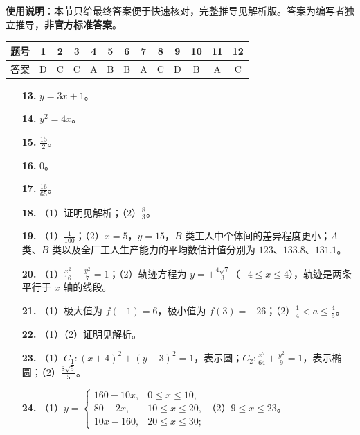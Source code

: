 
\begin{gknotice}
\textbf{使用说明}：本节只给最终答案便于快速核对，完整推导见解析版。答案为编写者独立推导，\textbf{非官方标准答案}。
\end{gknotice}

\begin{center}\begin{tabular}{ccccccccccccc}
\toprule
题号 & 1 & 2 & 3 & 4 & 5 & 6 & 7 & 8 & 9 & 10 & 11 & 12 \\
\midrule
答案 & D & C & C & A & B & B & A & C & D & B & A & C \\
\bottomrule
\end{tabular}\end{center}

\begin{itemize}[leftmargin=2.6em]
  \item[\textbf{13.}] $y=3x+1$。
  \item[\textbf{14.}] $y^2=4x$。
  \item[\textbf{15.}] $\frac{15}{2}$。
  \item[\textbf{16.}] $0$。
\end{itemize}

\begin{itemize}[leftmargin=2.6em]
  \item[\textbf{17.}] $\frac{16}{65}$。
  \item[\textbf{18.}] （1）证明见解析；（2）$\frac83$。
  \item[\textbf{19.}] （1）$\frac1{100}$；（2）$x=5$，$y=15$，$B$ 类工人中个体间的差异程度更小；$A$ 类、$B$ 类以及全厂工人生产能力的平均数估计值分别为 $123$、$133.8$、$131.1$。
  \item[\textbf{20.}] （1）$\frac{x^2}{16}+\frac{y^2}{7}=1$；（2）轨迹方程为 $y=\pm\frac{4\sqrt7}{3}$（$-4\leqslant x\leqslant4$），轨迹是两条平行于 $x$ 轴的线段。
  \item[\textbf{21.}] （1）极大值为 $f(-1)=6$，极小值为 $f(3)=-26$；（2）$\frac14<a\leqslant\frac45$。
\end{itemize}

\begin{itemize}[leftmargin=2.6em]
  \item[\textbf{22.}] （1）（2）证明见解析。
  \item[\textbf{23.}] （1）$C_1:(x+4)^2+(y-3)^2=1$，表示圆；$C_2:\frac{x^2}{64}+\frac{y^2}{9}=1$，表示椭圆；（2）$\frac{8\sqrt5}{5}$。
  \item[\textbf{24.}] （1）$y=\begin{cases}160-10x,&0\leqslant x\leqslant10,\\ 80-2x,&10\leqslant x\leqslant20,\\ 10x-160,&20\leqslant x\leqslant30;\end{cases}$（2）$9\leqslant x\leqslant23$。
\end{itemize}
